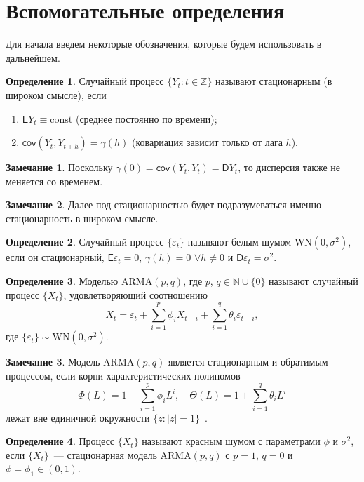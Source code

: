 \documentclass[specialist,
substylefile = spbu_report.rtx,
subf,href,colorlinks=true, 12pt]{disser}
\theoremstyle{definition}
\newtheorem{definition}{Определение}[chapter]
\newtheorem{remark}{Замечание}[chapter]
\newcommand{\Z}{\mathbb{Z}}
\newcommand{\const}{\mathrm{const}}
\begin{document}
\section{Вспомогательные определения}
Для начала введем некоторые обозначения, которые будем использовать в дальнейшем.
\begin{definition}\label{def:stationary}
	Случайный процесс $\{Y_t:t\in\Z\}$ называют стационарным (в широком смысле), если
	\begin{enumerate}
		\item $\mathsf{E}Y_t\equiv\const$ (среднее постоянно по времени);
		\item $\mathsf{cov}(Y_t,Y_{t+h})=\gamma(h)$ (ковариация зависит только от лага $h$).
	\end{enumerate}
\end{definition}
\begin{remark}
	Поскольку $\gamma(0)=\mathsf{cov}(Y_t,Y_t)=\mathsf{D}Y_t$, то дисперсия также не меняется со временем.
\end{remark}
\begin{remark}
	Далее под стационарностью будет подразумеваться именно стационарность в широком смысле.
\end{remark}
\begin{definition}
	Случайный процесс $\{\varepsilon_t\}$ называют белым шумом $\mathrm{WN}(0, \sigma^2)$, если он стационарный, $\mathsf{E}\varepsilon_t=0$, $\gamma(h)=0$ $\forall h\ne 0$ и $\mathsf{D}\varepsilon_t=\sigma^2$.
\end{definition}

\begin{definition}
	Моделью $\mathrm{ARMA}(p, q)$, где $p$, $q\in \mathbb{N}\cup\{0\}$ называют случайный процесс $\{X_t\}$, удовлетворяющий соотношению
	\[
		X_t=\varepsilon_t + \sum_{i=1}^p \phi_i X_{t-i} + \sum_{i=1}^q\theta_i\varepsilon_{t-i},
	\]
	где $\{\varepsilon_t\}\sim\mathrm{WN}(0, \sigma^2)$.
\end{definition}
\begin{remark}
	Модель $\mathrm{ARMA}(p, q)$ является стационарным и обратимым процессом, если корни характеристических полиномов
	\[
		\Phi(L)=1-\sum_{i=1}^p \phi_i L^i,\quad \Theta(L)=1+\sum_{i=1}^q \theta_i L^i
	\]
	лежат вне единичной окружности $\{z:|z|=1\}$~\cite[Section 3.4.1]{BoxJenkins2016}.
\end{remark}

\begin{definition}
	Процесс $\{X_t\}$ называют красным шумом с параметрами $\phi$ и $\sigma^2$, если $\{X_t\}$~--- стационарная модель $\mathrm{ARMA}(p, q)$ с $p=1$, $q=0$ и $\phi=\phi_1\in(0, 1)$.
\end{definition}
\end{document}
